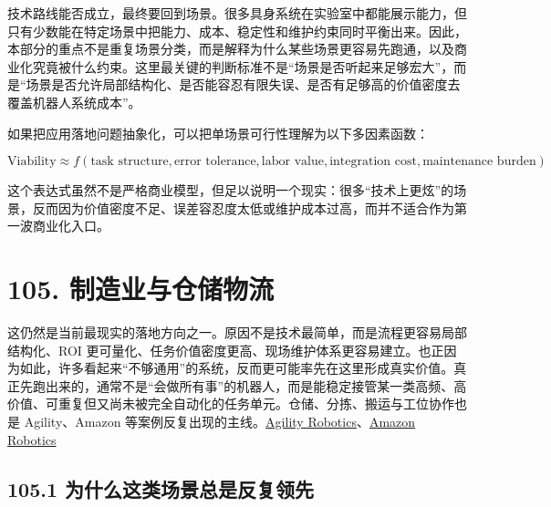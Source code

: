 

技术路线能否成立，最终要回到场景。很多具身系统在实验室中都能展示能力，但只有少数能在特定场景中把能力、成本、稳定性和维护约束同时平衡出来。因此，本部分的重点不是重复场景分类，而是解释为什么某些场景更容易先跑通，以及商业化究竟被什么约束。这里最关键的判断标准不是“场景是否听起来足够宏大”，而是“场景是否允许局部结构化、是否能容忍有限失误、是否有足够高的价值密度去覆盖机器人系统成本”。

如果把应用落地问题抽象化，可以把单场景可行性理解为以下多因素函数：

\begingroup
\scriptsize
\begin{equation*}
\text{Viability} \approx f(\text{task structure}, \text{error tolerance}, \text{labor value}, \text{integration cost}, \text{maintenance burden})
\end{equation*}
\endgroup

这个表达式虽然不是严格商业模型，但足以说明一个现实：很多“技术上更炫”的场景，反而因为价值密度不足、误差容忍度太低或维护成本过高，而并不适合作为第一波商业化入口。

\section*{105. 制造业与仓储物流}

这仍然是当前最现实的落地方向之一。原因不是技术最简单，而是流程更容易局部结构化、ROI 更可量化、任务价值密度更高、现场维护体系更容易建立。也正因为如此，许多看起来“不够通用”的系统，反而更可能率先在这里形成真实价值。真正先跑出来的，通常不是“会做所有事”的机器人，而是能稳定接管某一类高频、高价值、可重复但又尚未被完全自动化的任务单元。仓储、分拣、搬运与工位协作也是 Agility、Amazon 等案例反复出现的主线。\href{https://agilityrobotics.com/}{Agility Robotics}、\href{https://www.aboutamazon.com/news/operations/amazon-tests-digit-humanoid-robot}{Amazon Robotics}

\subsection*{105.1 为什么这类场景总是反复领先}


